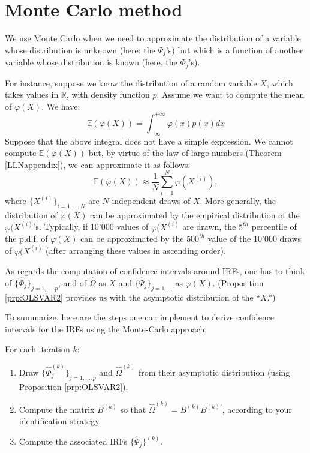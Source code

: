 \documentclass[
  12pt,
]{book}
\providecommand{\tightlist}{%
  \setlength{\itemsep}{0pt}\setlength{\parskip}{0pt}}
\theoremstyle{definition}
\theoremstyle{definition}
\theoremstyle{definition}
\theoremstyle{definition}
\theoremstyle{remark}
\begin{document}
\hypertarget{monte-carlo-method}{%
\section{Monte Carlo method}\label{monte-carlo-method}}

We use Monte Carlo when we need to approximate the distribution of a variable whose distribution is unknown (here: the \(\Psi_j\)'s) but which is a function of another variable whose distribution is known (here, the \(\Phi_j\)'s).

For instance, suppose we know the distribution of a random variable \(X\), which takes values in \(\mathbb{R}\), with density function \(p\). Assume we want to compute the mean of \(\varphi(X)\). We have:
\[
\mathbb{E}(\varphi(X))=\int_{-\infty}^{+\infty}\varphi(x)p(x)dx
\]
Suppose that the above integral does not have a simple expression. We cannot compute \(\mathbb{E}(\varphi(X))\) but, by virtue of the law of large numbers (Theorem \ref{LLNappendix}), we can approximate it as follows:
\[
\mathbb{E}(\varphi(X))\approx\frac{1}{N}\sum_{i=1}^N\varphi(X^{(i)}),
\]
where \(\{X^{(i)}\}_{i=1,...,N}\) are \(N\) independent draws of \(X\). More generally, the distribution of \(\varphi(X)\) can be approximated by the empirical distribution of the \(\varphi(X^{(i)}\)'s. Typically, if 10'000 values of \(\varphi(X^{(i)}\) are drawn, the \(5^{th}\) percentile of the p.d.f. of \(\varphi(X)\) can be approximated by the \(500^{th}\) value of the 10'000 draws of \(\varphi(X^{(i)}\) (after arranging these values in ascending order).

As regards the computation of confidence intervals around IRFs, one has to think of \(\{\widehat{\Phi}_j\}_{j=1,...,p}\), and of \(\widehat{\Omega}\) as \(X\) and \(\{\widehat{\Psi}_j\}_{j=1,...}\) as \(\varphi(X)\). (Proposition \ref{prp:OLSVAR2} provides us with the asymptotic distribution of the ``\(X\).'')

To summarize, here are the steps one can implement to derive confidence intervals for the IRFs using the Monte-Carlo approach:

For each iteration \(k\):

\begin{enumerate}
\def\labelenumi{\arabic{enumi}.}
\tightlist
\item
  Draw \(\{\widehat{\Phi}_j^{(k)}\}_{j=1,...,p}\) and \(\widehat{\Omega}^{(k)}\) from their asymptotic distribution (using Proposition \ref{prp:OLSVAR2}).
\item
  Compute the matrix \(B^{(k)}\) so that \(\widehat{\Omega}^{(k)}=B^{(k)}B^{(k)'}\), according to your identification strategy.
\item
  Compute the associated IRFs \(\{\widehat{\Psi}_j\}^{(k)}\).
\end{enumerate}
\end{document}
